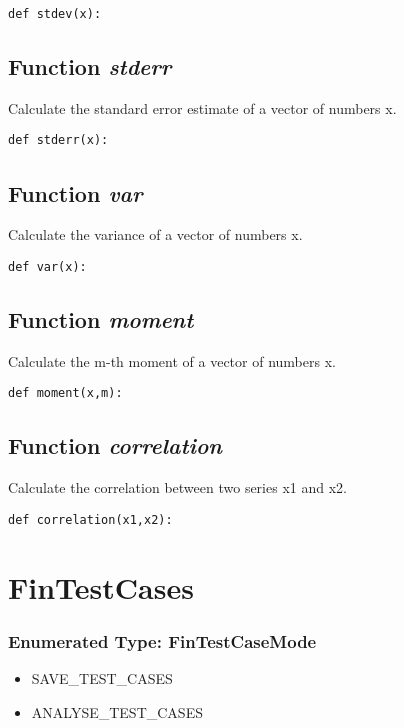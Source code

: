\documentclass[twoside,11pt]{book}
\begin{document}
\begin{lstlisting}
def stdev(x):
\end{lstlisting}

\subsection{Function {\it stderr}}
Calculate the standard error estimate of a vector of numbers x. 

\begin{lstlisting}
def stderr(x):
\end{lstlisting}

\subsection{Function {\it var}}
Calculate the variance of a vector of numbers x. 

\begin{lstlisting}
def var(x):
\end{lstlisting}

\subsection{Function {\it moment}}
Calculate the m-th moment of a vector of numbers x. 

\begin{lstlisting}
def moment(x,m):
\end{lstlisting}

\subsection{Function {\it correlation}}
Calculate the correlation between two series x1 and x2. 

\begin{lstlisting}
def correlation(x1,x2):
\end{lstlisting}

\newpage
\section{FinTestCases}

\subsubsection{Enumerated Type: FinTestCaseMode}
\begin{itemize}
\item{SAVE\_TEST\_CASES}
\item{ANALYSE\_TEST\_CASES}
\end{itemize}
\end{document}
